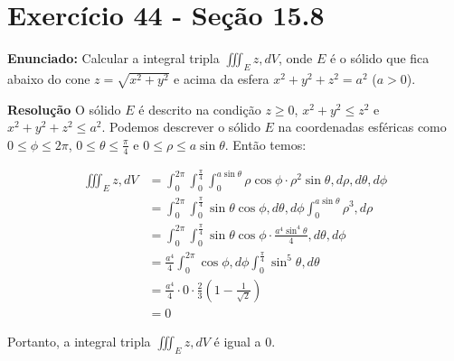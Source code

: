 \documentclass{article}
\begin{document}
\section*{Exercício 44 - Seção 15.8}
\textbf{Enunciado:} Calcular a integral tripla $\iiint_E z,dV$, onde $E$ é o sólido que fica abaixo do cone $z=\sqrt{x^2+y^2}$ e acima da esfera $x^2+y^2+z^2=a^2$ ($a>0$).

\textbf{Resolução} O sólido $E$ é descrito na condição $z \geq 0$, $x^2 + y^2 \leq z^2$ e $x^2+y^2+z^2\leq a^2$. Podemos descrever o sólido $E$ na coordenadas esféricas como $0 \leq \phi \leq 2\pi$, $0 \leq \theta \leq \frac{\pi}{4}$ e $0 \leq \rho \leq a \sin\theta$. Então temos:

\begin{align*}
\iiint_E z,dV &= \int_0^{2\pi}\int_0^{\frac{\pi}{4}}\int_0^{a\sin\theta} \rho\cos\phi\cdot \rho^2\sin\theta,d\rho,d\theta,d\phi \\
&= \int_0^{2\pi}\int_0^{\frac{\pi}{4}}\sin\theta\cos\phi,d\theta,d\phi \int_0^{a\sin\theta} \rho^3,d\rho\\
&= \int_0^{2\pi}\int_0^{\frac{\pi}{4}}\sin\theta\cos\phi\cdot \frac{a^4\sin^4\theta}{4},d\theta,d\phi \\
&= \frac{a^4}{4}\int_0^{2\pi}\cos\phi,d\phi\int_0^{\frac{\pi}{4}}\sin^5\theta,d\theta \\
&= \frac{a^4}{4}\cdot 0 \cdot \frac{2}{3}\left(1-\frac{1}{\sqrt{2}}\right) \\
&= 0
\end{align*}

Portanto, a integral tripla $\iiint_E z,dV$ é igual a $0$.
\end{document}
